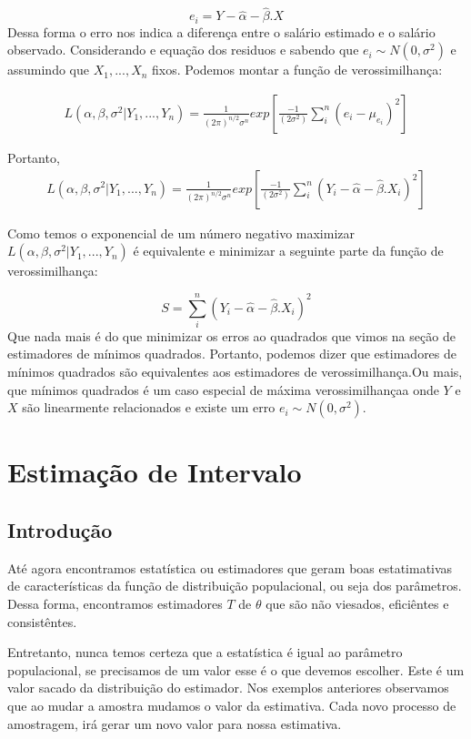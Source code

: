 \documentclass[
  letterpaper,
  DIV=11,
  numbers=noendperiod]{scrartcl}
\begin{document}
\[e_i=Y-\hat{\alpha}-\hat{\beta} . X\] Dessa forma o erro nos indica a
diferença entre o salário estimado e o salário observado. Considerando e
equação dos residuos e sabendo que \(e_i \sim N(0,\sigma^2)\) e
assumindo que \(X_1,..., X_n\) fixos. Podemos montar a função de
verossimilhança:

\[\begin{array}{ccc}
L(\alpha, \beta,\sigma^2|Y_1,...,Y_n)= \frac{1}{(2 \pi) ^{n/2}\sigma^n} exp[ \frac{-1}{(2\sigma^2)} \sum_i^n (e_i - \mu_{e_i})^2]
\end{array}\]

Portanto, \[\begin{array}{ccc}
L(\alpha, \beta, \sigma^2|Y_1,...,Y_n)= \frac{1}{(2 \pi) ^{n/2}\sigma^n} exp[ \frac{-1}{(2\sigma^2)} \sum_i^n (Y_i-\hat{\alpha}-\hat{\beta}.X_i)^2]
\end{array}\]

Como temos o exponencial de um número negativo maximizar
\(L(\alpha, \beta, \sigma^2|Y_1,...,Y_n)\) é equivalente e minimizar a
seguinte parte da função de verossimilhança:

\[S=\sum_i^n (Y_i-\hat{\alpha}-\hat{\beta}.X_i)^2\] Que nada mais é do
que minimizar os erros ao quadrados que vimos na seção de estimadores de
mínimos quadrados. Portanto, podemos dizer que estimadores de mínimos
quadrados são equivalentes aos estimadores de verossimilhança.Ou mais,
que mínimos quadrados é um caso especial de máxima verossimilhançaa onde
\(Y\) e \(X\) são linearmente relacionados e existe um erro
\(e_i \sim N(0,\sigma^2)\).

\section{Estimação de Intervalo}\label{estimauxe7uxe3o-de-intervalo}

\subsection{Introdução}\label{introduuxe7uxe3o-1}

Até agora encontramos estatística ou estimadores que geram boas
estatimativas de características da função de distribuição populacional,
ou seja dos parâmetros. Dessa forma, encontramos estimadores \(T\) de
\(\theta\) que são não viesados, eficiêntes e consistêntes.

Entretanto, nunca temos certeza que a estatística é igual ao parâmetro
populacional, se precisamos de um valor esse é o que devemos escolher.
Este é um valor sacado da distribuição do estimador. Nos exemplos
anteriores observamos que ao mudar a amostra mudamos o valor da
estimativa. Cada novo processo de amostragem, irá gerar um novo valor
para nossa estimativa.
\end{document}
